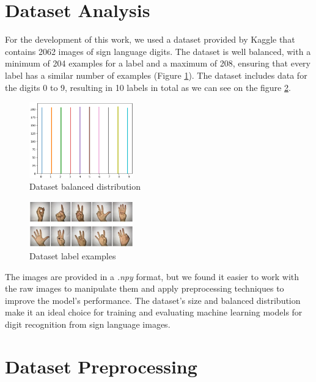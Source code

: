\documentclass[conference]{IEEEtran}
\begin{document}
\section{Dataset Analysis}
For the development of this work, we used a dataset provided by Kaggle that contains 2062 images of sign language digits. The dataset is well balanced, with a minimum of 204 examples for a label and a maximum of 208, ensuring that every label has a similar number of examples (Figure \ref{fig:dataset-balanced}). The dataset includes data for the digits 0 to 9, resulting in 10 labels in total as we can see on the figure \ref{fig:dataset-examples}. 

\begin{figure}[h]
    \centering
    \includegraphics[width=0.4\textwidth]{assets/dataset-labels.png}
    \caption{Dataset balanced distribution}
    \label{fig:dataset-balanced}
\end{figure}


\begin{figure}[h]
    \centering
    \includegraphics[width=0.4\textwidth]{assets/sign-language-digits.png}
    \caption{Dataset label examples}
    \label{fig:dataset-examples}
\end{figure}

The images are provided in a \textit{.npy} format, but we found it easier to work with the raw images to manipulate them and apply preprocessing techniques to improve the model's performance. The dataset's size and balanced distribution make it an ideal choice for training and evaluating machine learning models for digit recognition from sign language images.

\section{Dataset Preprocessing}
\end{document}
